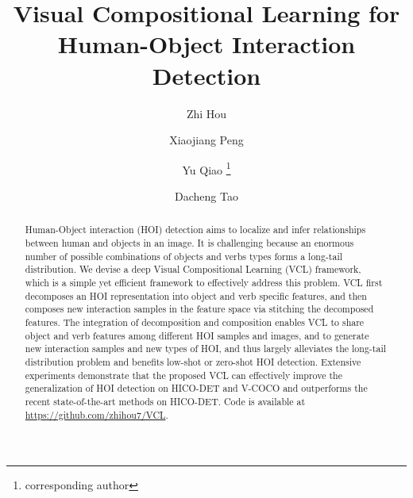\documentclass[runningheads]{llncs}
\begin{document}
\pagestyle{headings}
\mainmatter
\def\ECCVSubNumber{2400}  

\title{Visual Compositional Learning for Human-Object Interaction Detection} 

\begin{comment}
\titlerunning{ECCV-20 submission ID \ECCVSubNumber}
\authorrunning{ECCV-20 submission ID \ECCVSubNumber}
\author{Anonymous ECCV submission}
\institute{Paper ID \ECCVSubNumber}
\end{comment}


\author{Zhi Hou\and
Xiaojiang Peng\and
Yu Qiao \thanks{corresponding author} \and
Dacheng Tao}




\maketitle

\begin{abstract}

  Human-Object interaction (HOI) detection aims to localize and infer relationships between human and objects in an image. It is challenging because an enormous number of possible combinations of objects and verbs types forms a long-tail distribution. We devise a deep Visual Compositional Learning (VCL) framework, which is a simple yet efficient framework to effectively address this problem. VCL first decomposes an HOI representation into object and verb specific features, and then composes new interaction samples in the feature space via stitching the decomposed features. The integration of decomposition and composition enables VCL to share object and verb features among different HOI samples and images, and to generate new interaction samples and new types of HOI, and thus largely alleviates the long-tail distribution problem and benefits low-shot or zero-shot HOI detection. Extensive experiments demonstrate that the proposed VCL can effectively improve the generalization of HOI detection on HICO-DET and V-COCO and outperforms the recent state-of-the-art methods on HICO-DET. Code is available at \url{https://github.com/zhihou7/VCL}.

\end{abstract}
\end{document}
